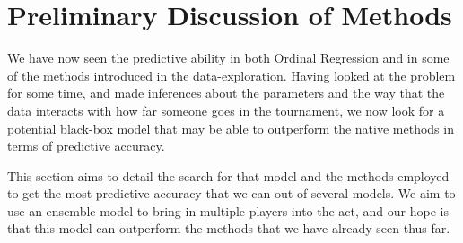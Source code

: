\documentclass[10pt,a4paper, hidelinks]{article} %
\begin{document}
%


\section{Preliminary Discussion of Methods}

We have now seen the predictive ability in both Ordinal Regression and in some of the methods introduced in the data-exploration. Having looked at the problem for some time, and made inferences about the parameters and the way that the data interacts with how far someone goes in the tournament, we now look for a potential black-box model that may be able to outperform the native methods in terms of predictive accuracy. 

This section aims to detail the search for that model and the methods employed to get the most predictive accuracy that we can out of several models. We aim to use an ensemble model to bring in multiple players into the act, and our hope is that this model can outperform the methods that we have already seen thus far. 
\end{document}
